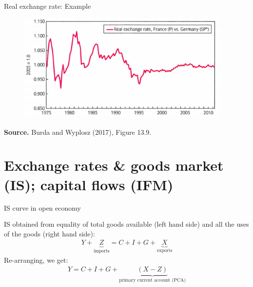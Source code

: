 \documentclass{beamer}
\begin{document}
\begin{frame}{Real exchange rate: Example}
  
  \begin{figure}[ht]
	\centering
	\includegraphics[width=0.95\textwidth]{FIGURES/Fig_13_9_RER_France_Germany}
 \end{figure}
 \begin{minipage}{0.6\columnwidth}
\tiny	
\textbf{Source.} Burda and Wyplosz (2017), Figure 13.9.\\
\end{minipage}
\end{frame}


\section{Exchange rates \& goods market (IS); capital flows (IFM)}
\begin{frame}
\tableofcontents[currentsection]
\end{frame}
\begin{frame}{IS curve in open economy}

  IS obtained from equality of total goods available (left hand side) and all the uses of the goods (right hand side):
\begin{align*}
  Y + \underbrace{Z}_{\text{imports}}=C+I+G+\underbrace{X}_{\text{exports}} 
\end{align*}
Re-arranging, we get:
\begin{align*}
  Y=C+I+G+\underbrace{(X-Z)}_{\text{primary current account (PCA)}}
\end{align*}
\end{frame}
\end{document}
